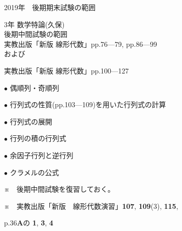 \documentclass[a4paper,landscape,10pt,onecolumn,oneside,notitlepage,final]{jsarticle} %
\newcommand{\printtitle}{2019年　後期期末試験の範囲\par 3年 数学特論(久保)}
\begin{document}

\begin{multicols}{2}

\vspace*{15mm}
\Large
\printtitle\\

\large
後期中間試験の範囲\\
実教出版「新版 線形代数」pp.76---79, pp.86---99\\
および\par

実教出版「新版 線形代数」pp.100---127\par

$\bullet$ 偶順列・奇順列\par
$\bullet$ 行列式の性質(pp.103---109)を用いた行列式の計算\par
$\bullet$ 行列式の展開\par
$\bullet$ 行列の積の行列式\par
$\bullet$ 余因子行列と逆行列\par
$\bullet$ クラメルの公式\par

\vspace{10mm}
※　後期中間試験を復習しておく。\par
※　実教出版「新版　線形代数演習」{\bf 107}, {\bf 109}(3), {\bf 115},\par
p.36{\bf A}の {\bf 1}, {\bf 3}, {\bf 4}\par

\normalsize
\columnbreak %

\renewcommand{\ctoi}{Ckeep} %
\renewcommand{\ckai}{Comit} %
\small\printdoc

\newpage

\renewcommand{\ctoi}{Comit}    %
\renewcommand{\ckai}{Cmagenta} %
\printdoc

\newpage

\end{multicols}
\end{document}
